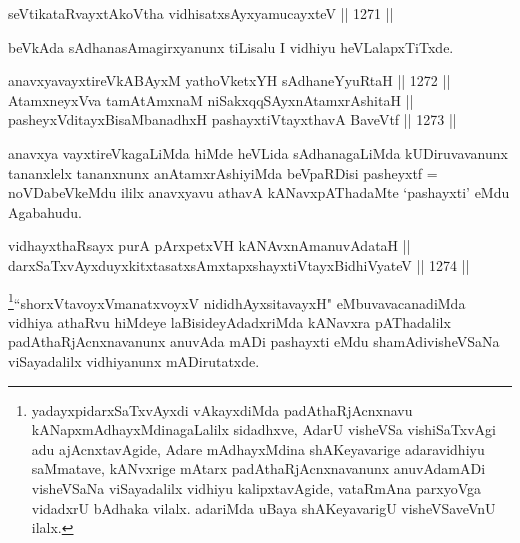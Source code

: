\begin{shl}
seVtikataRvayxtAkoV\s tha vidhisatxsAyxyamucayxteV \hfill || 1271 ||  
\end{shl}

\begin{artha}
beVkAda sAdhanasAmagirxyanunx tiLisalu I vidhiyu heVLalapxTiTxde.
\end{artha}

\begin{shl}
anavxyavayxtireVkABAyxM yathoVketxYH sAdhaneYyuRtaH \hfill || 1272 ||  \\
AtamxneyxVva tamAtAmxnaM niSakxqqSAyxnAtamxrAshitaH ||  \\
pasheyxVditayxBisaMbanadhxH pashayxtiVtayxthavA BaveVtf \hfill || 1273 ||  
\end{shl}

\begin{artha}
anavxya vayxtireVkagaLiMda hiMde heVLida sAdhanagaLiMda kUDiruvavanunx tananxlelx tananxnunx anAtamxrAshiyiMda beVpaRDisi pasheyxtf = noVDabeVkeMdu ililx anavxyavu athavA kANavxpAThadaMte `pashayxti' eMdu Agabahudu.
\end{artha}


\begin{shl}
vidhayxthaRsayx purA pArxpetxVH kANAvxnAmanuvAdataH || \\
darxSaTxvAyxduyxkitxtasatxsAmxtapxshayxtiVtayxBidhiVyateV \hfill || 1274 ||  
\end{shl}

\begin{artha}
\footnote{yadayxpidarxSaTxvAyxdi vAkayxdiMda padAthaRjAcnxnavu kANapxmAdhayxMdinagaLalilx sidadhxve, AdarU visheVSa vishiSaTxvAgi adu ajAcnxtavAgide, Adare mAdhayxMdina shAKeyavarige adaravidhiyu saMmatave, kANvxrige mAtarx padAthaRjAcnxnavanunx anuvAdamADi visheVSaNa viSayadalilx vidhiyu kalipxtavAgide, vataRmAna parxyoVga vidadxrU bAdhaka vilalx. adariMda uBaya shAKeyavarigU visheVSaveVnU ilalx.}``shorxVtavoyxVmanatxvoyxV nididhAyxsitavayxH" eMbuvavacanadiMda vidhiya athaRvu hiMdeye laBisideyAdadxriMda kANavxra pAThadalilx padAthaRjAcnxnavanunx anuvAda mADi pashayxti eMdu shamAdivisheVSaNa viSayadalilx vidhiyanunx mADirutatxde. 
\end{artha}


